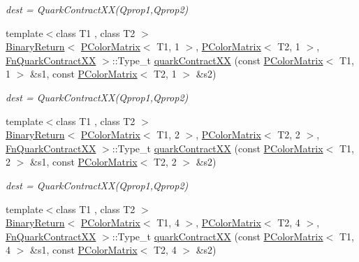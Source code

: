 \begin{DoxyCompactItemize}
\begin{DoxyCompactList}\small\item\em dest = Quark\+Contract\+X\+X(\+Qprop1,\+Qprop2) \end{DoxyCompactList}\item 
{\footnotesize template$<$class T1 , class T2 $>$ }\\\mbox{\hyperlink{structENSEM_1_1BinaryReturn}{Binary\+Return}}$<$ \mbox{\hyperlink{classENSEM_1_1PColorMatrix}{P\+Color\+Matrix}}$<$ T1, 1 $>$, \mbox{\hyperlink{classENSEM_1_1PColorMatrix}{P\+Color\+Matrix}}$<$ T2, 1 $>$, \mbox{\hyperlink{structENSEM_1_1FnQuarkContractXX}{Fn\+Quark\+Contract\+XX}} $>$\+::Type\+\_\+t \mbox{\hyperlink{group__primcolormatrix_gadb40ddb5edfab27bf7bb4b8cd7430ad6}{quark\+Contract\+XX}} (const \mbox{\hyperlink{classENSEM_1_1PColorMatrix}{P\+Color\+Matrix}}$<$ T1, 1 $>$ \&s1, const \mbox{\hyperlink{classENSEM_1_1PColorMatrix}{P\+Color\+Matrix}}$<$ T2, 1 $>$ \&s2)
\begin{DoxyCompactList}\small\item\em dest = Quark\+Contract\+X\+X(\+Qprop1,\+Qprop2) \end{DoxyCompactList}\item 
{\footnotesize template$<$class T1 , class T2 $>$ }\\\mbox{\hyperlink{structENSEM_1_1BinaryReturn}{Binary\+Return}}$<$ \mbox{\hyperlink{classENSEM_1_1PColorMatrix}{P\+Color\+Matrix}}$<$ T1, 2 $>$, \mbox{\hyperlink{classENSEM_1_1PColorMatrix}{P\+Color\+Matrix}}$<$ T2, 2 $>$, \mbox{\hyperlink{structENSEM_1_1FnQuarkContractXX}{Fn\+Quark\+Contract\+XX}} $>$\+::Type\+\_\+t \mbox{\hyperlink{group__primcolormatrix_gaeaaf0956a43ba474c9f772480094c1f5}{quark\+Contract\+XX}} (const \mbox{\hyperlink{classENSEM_1_1PColorMatrix}{P\+Color\+Matrix}}$<$ T1, 2 $>$ \&s1, const \mbox{\hyperlink{classENSEM_1_1PColorMatrix}{P\+Color\+Matrix}}$<$ T2, 2 $>$ \&s2)
\begin{DoxyCompactList}\small\item\em dest = Quark\+Contract\+X\+X(\+Qprop1,\+Qprop2) \end{DoxyCompactList}\item 
{\footnotesize template$<$class T1 , class T2 $>$ }\\\mbox{\hyperlink{structENSEM_1_1BinaryReturn}{Binary\+Return}}$<$ \mbox{\hyperlink{classENSEM_1_1PColorMatrix}{P\+Color\+Matrix}}$<$ T1, 4 $>$, \mbox{\hyperlink{classENSEM_1_1PColorMatrix}{P\+Color\+Matrix}}$<$ T2, 4 $>$, \mbox{\hyperlink{structENSEM_1_1FnQuarkContractXX}{Fn\+Quark\+Contract\+XX}} $>$\+::Type\+\_\+t \mbox{\hyperlink{group__primcolormatrix_ga8f56e6d4ff1d01fb47481eb16006efa7}{quark\+Contract\+XX}} (const \mbox{\hyperlink{classENSEM_1_1PColorMatrix}{P\+Color\+Matrix}}$<$ T1, 4 $>$ \&s1, const \mbox{\hyperlink{classENSEM_1_1PColorMatrix}{P\+Color\+Matrix}}$<$ T2, 4 $>$ \&s2)

\end{DoxyCompactItemize}

